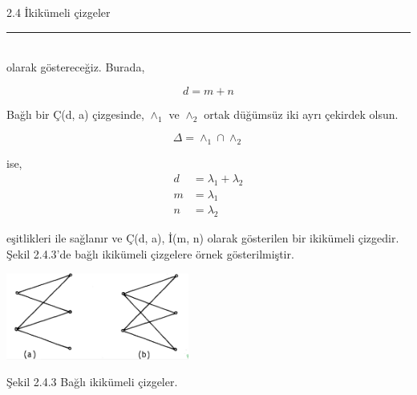 \documentclass[11pt]{amsbook}
\begin{document}
2.4 İkikümeli çizgeler\\
\rule{\textwidth}{1pt}\\




olarak göstereceğiz. Burada, 

\[
	d=m+n
\]

Bağlı bir Ç(d, a) çizgesinde, $\wedge_1$ ve $\wedge_2$ ortak düğümsüz iki ayrı çekirdek olsun.

\[
	\Delta=\wedge_1 \cap \wedge_2
\]

ise, 
\begin{align*} 
	d&=\lambda_1+\lambda_2 \\
	m&=\lambda_1 \\
	n&=\lambda_2
\end{align*}
	

eşitlikleri ile sağlanır ve Ç(d, a), İ(m, n) olarak gösterilen bir ikikümeli çizgedir. Şekil 2.4.3'de  bağlı ikikümeli çizgelere örnek gösterilmiştir.

	\centering
	\includegraphics[width=0.45\textwidth]{images/ceyhun-076-fig01}

Şekil 2.4.3 Bağlı ikikümeli çizgeler.
\end{document}
